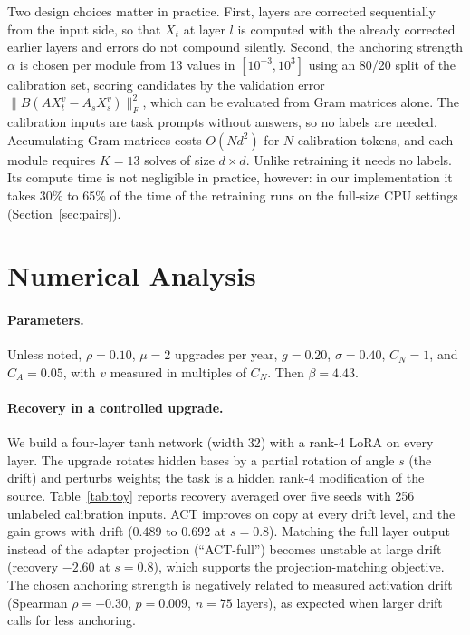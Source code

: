 \documentclass[preprint,12pt,authoryear]{elsarticle}
\begin{document}
Two design choices matter in practice. First, layers are corrected sequentially from the input side, so that $X_t$ at
layer $l$ is computed with the already corrected earlier layers and errors do not compound silently. Second, the
anchoring strength $\alpha$ is chosen per module from 13 values in $[10^{-3},10^{3}]$ using an 80/20 split of the
calibration set, scoring candidates by the validation error $\|B(AX_t^{v}-A_sX_s^{v})\|_F^2$, which can be evaluated from
Gram matrices alone. The calibration inputs are task prompts without answers, so no labels are needed.
Accumulating Gram matrices costs $O(Nd^2)$ for $N$ calibration tokens, and each module requires $K=13$ solves of size
$d\times d$. Unlike retraining it needs no labels. Its compute time is not negligible in practice, however: in our
implementation it takes 30\% to 65\% of the time of the retraining runs on the full-size CPU settings (Section~\ref{sec:pairs}).

\section{Numerical Analysis}\label{sec:numerical}

\paragraph{Parameters.} Unless noted, $\rho=0.10$, $\mu=2$ upgrades per year, $g=0.20$, $\sigma=0.40$, $C_N=1$, and
$C_A=0.05$, with $v$ measured in multiples of $C_N$. Then $\beta=4.43$.

\paragraph{Recovery in a controlled upgrade.} We build a four-layer tanh network (width 32) with a rank-4 LoRA on
every layer. The upgrade rotates hidden bases by a partial rotation of angle $s$ (the drift) and perturbs weights; the
task is a hidden rank-4 modification of the source. Table~\ref{tab:toy} reports recovery averaged over five seeds
with 256 unlabeled calibration inputs. ACT improves on copy at every drift level, and the gain grows with drift
(0.489 to 0.692 at $s=0.8$). Matching the full layer output instead of the adapter projection (``ACT-full'') becomes
unstable at large drift (recovery $-2.60$ at $s=0.8$), which supports the projection-matching objective. The chosen
anchoring strength is negatively related to measured activation drift (Spearman $\rho=-0.30$, $p=0.009$,
$n=75$ layers), as expected when larger drift calls for less anchoring.
\end{document}
